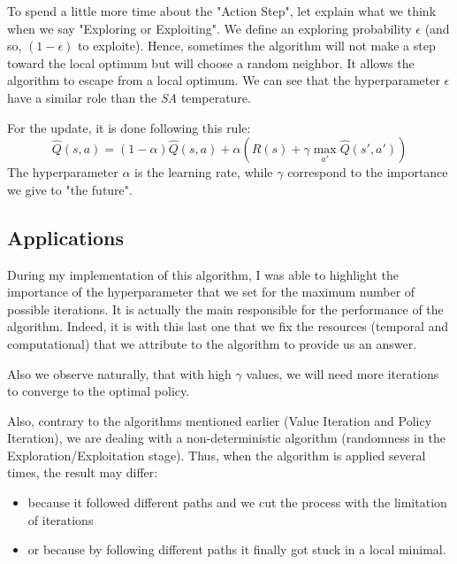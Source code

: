 \documentclass[11pt]{article}
\begin{document}
\begin{multicols}{2}
To spend a little more time about the   "Action Step", let explain what we think when we say "Exploring or Exploiting". We define an exploring probability  $\epsilon$ (and so, $(1-\epsilon)$ to exploite). Hence, sometimes the algorithm will not make a step toward the local optimum but will choose a random neighbor. It allows the algorithm to escape from a local optimum. We can see that the hyperparameter $\epsilon$ have a similar role than the \textit{SA} temperature. 

For the update, it is done following this rule:
$$ \hat{Q}(s, a) = (1-\alpha )\hat{Q}(s, a) + \alpha \left( R(s)+\gamma \underset{a'}{\max} \hat{Q}(s', a')  \right)$$
The hyperparameter $\alpha$ is the learning rate, while $\gamma$ correspond to the importance we give to "the future".


\subsection{Applications}

During my implementation of this algorithm, I was able to highlight the importance of the hyperparameter that we set for the maximum number of possible iterations. It is actually the main responsible for the performance of the algorithm. Indeed, it is with this last one that we fix the resources (temporal and computational) that we attribute to the algorithm to provide us an answer.

Also we observe naturally, that with high $\gamma$ values, we will need more iterations to converge to the optimal policy.

Also, contrary to the algorithms mentioned earlier (Value Iteration and Policy Iteration), we are dealing with a non-deterministic algorithm (randomness in the Exploration/Exploitation stage). Thus, when the algorithm is applied several times, the result may differ: 
\begin{itemize}
\item because it followed different paths and we cut the process with the limitation of iterations
\item or because by following different paths it finally got stuck in a local minimal.
\end{itemize}



\end{multicols}
\end{document}
